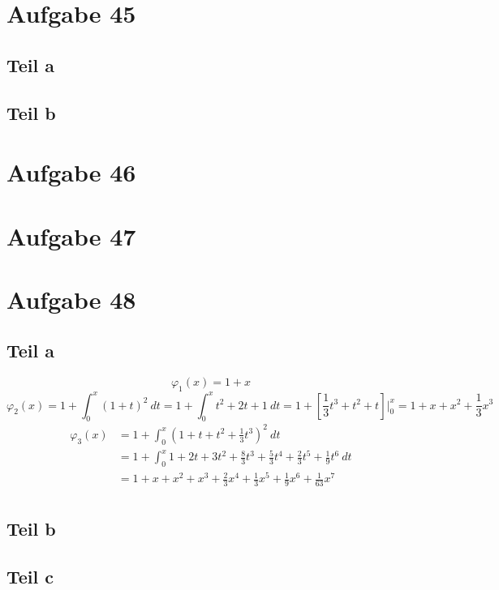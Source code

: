 \documentclass[10pt,a4paper]{article}
\begin{document}
\section*{Aufgabe 45}

\subsection*{Teil a}

\subsection*{Teil b}

\section*{Aufgabe 46}

\section*{Aufgabe 47}

\section*{Aufgabe 48}

\subsection*{Teil a}

\begin{equation}
\varphi_{1}(x) = 1 + x
\end{equation}
\begin{equation}
\varphi_{2}(x) = 1 + \int_{0}^{x} (1 + t)^{2}\ dt = 1 + \int_{0}^{x} t^{2} + 2t + 1\ dt = 1 + [\frac{1}{3}t^{3} + t^{2} + t]|^{x}_{0} = 1 + x + x^{2} + \frac{1}{3}x^{3}
\end{equation}
\begin{align*}
\varphi_{3}(x) & = 1 + \int_{0}^{x} (1 + t + t^{2} + \frac{1}{3}t^{3})^{2}\ dt\\
& = 1 + \int_{0}^{x} 1 + 2t + 3t^{2} + \frac{8}{3}t^{3} + \frac{5}{3}t^{4} + \frac{2}{3}t^{5} + \frac{1}{9}t^{6}\ dt\\
& = 1 + x + x^{2} + x^{3} + \frac{2}{3}x^{4} + \frac{1}{3}x^{5} + \frac{1}{9}x^{6} + \frac{1}{63}x^{7}\\
\end{align*}

\subsection*{Teil b}

\subsection*{Teil c}
\end{document}
